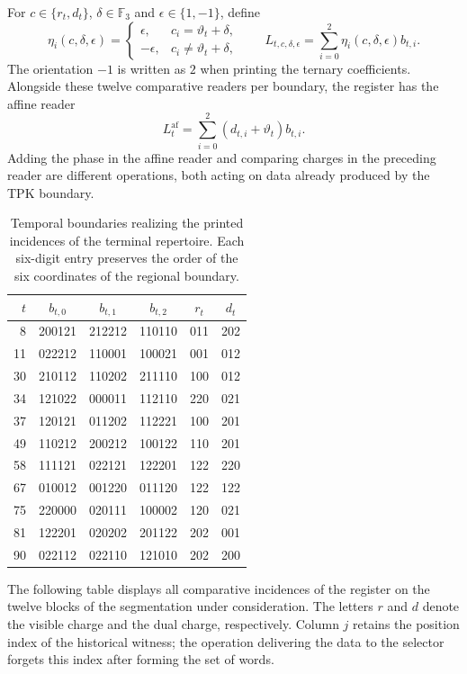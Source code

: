 For $c\in\{r_t,d_t\}$, $\delta\in\mathbb F_3$ and
$\epsilon\in\{1,-1\}$, define
\[
 \eta_i(c,\delta,\epsilon)=
 \begin{cases}
  \epsilon,&c_i=\vartheta_t+\delta,\\
  -\epsilon,&c_i\ne\vartheta_t+\delta,
 \end{cases}
 \qquad
 L_{t,c,\delta,\epsilon}
   =\sum_{i=0}^{2}\eta_i(c,\delta,\epsilon)b_{t,i}.
\]
The orientation $-1$ is written as $2$ when printing the ternary
coefficients. Alongside these twelve comparative readers per boundary, the
register has the affine reader
\[
 L^{\mathrm{af}}_t
    =\sum_{i=0}^{2}(d_{t,i}+\vartheta_t)b_{t,i}.
\]
Adding the phase in the affine reader and comparing charges in
the preceding reader are different operations, both acting on data already
produced by the TPK boundary.

\begin{table}[htbp]
\centering\small
\begin{tabular}{rccc cc}
\toprule
$t$&$b_{t,0}$&$b_{t,1}$&$b_{t,2}$&$r_t$&$d_t$\\
\midrule
8 &200121&212212&110110&011&202\\
11&022212&110001&100021&001&012\\
30&210112&110202&211110&100&012\\
34&121022&000011&112110&220&021\\
37&120121&011202&112221&100&201\\
49&110212&200212&100122&110&201\\
58&111121&022121&122201&122&220\\
67&010012&001220&011120&122&122\\
75&220000&020111&100002&120&021\\
81&122201&020202&201122&202&001\\
90&022112&022110&121010&202&200\\
\bottomrule
\end{tabular}
\caption{Temporal boundaries realizing the printed incidences of the
terminal repertoire. Each six-digit entry preserves the order of
the six coordinates of the regional boundary.}
\label{act21:tab:terminal-bandas-testigo}
\end{table}

The following table displays all comparative incidences of the
register on the twelve blocks of the segmentation under consideration. The
letters $r$ and $d$ denote the visible charge and the dual charge,
respectively. Column $j$ retains the position index of the historical witness;
the operation delivering the data to the selector forgets this index after forming
the set of words.

